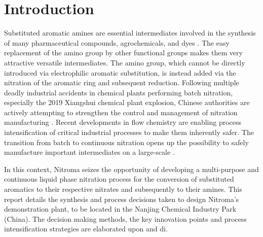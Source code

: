 \section{Introduction} %

Substituted aromatic amines are essential intermediates involved in the synthesis of many pharmaceutical compounds, agrochemicals, and dyes \cite{vogt_amines_2000}. The easy replacement of the amino group by other functional groups makes them very attractive versatile intermediates. The amino group, which cannot be directly introduced via electrophilic aromatic substitution, is instead added via the nitration of the aromatic ring and subsequent reduction.
Following multiple deadly industrial accidents in chemical plants performing batch nitration, especially the 2019 Xiangshui chemical plant explosion, Chinese authorities are actively attempting to strengthen the control and management of nitration manufacturing \cite{el_diario_china_2019}.
Recent developments in flow chemistry are enabling process intensification of critical industrial processes to make them inherently safer. The transition from batch to continuous nitration opens up the possibility to safely manufacture important intermediates on a large-scale \cite{di_miceli_raimondi_safety_2015}.

In this context, Nitroma seizes the opportunity of developing a multi-purpose and continuous liquid phase nitration process for the conversion of substituted aromatics to their respective nitrates and subsequently to their amines. 
This report details the synthesis and process decisions taken to design Nitroma’s demonstration plant, to be located in the Nanjing Chemical Industry Park (China). The decision making methods, the key innovation points and process intensification strategies are elaborated upon and di.
